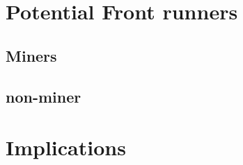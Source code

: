 





\section{Potential Front runners} %





\subsection{Miners}
% 



\subsection{non-miner}
% 





\section{Implications} %

